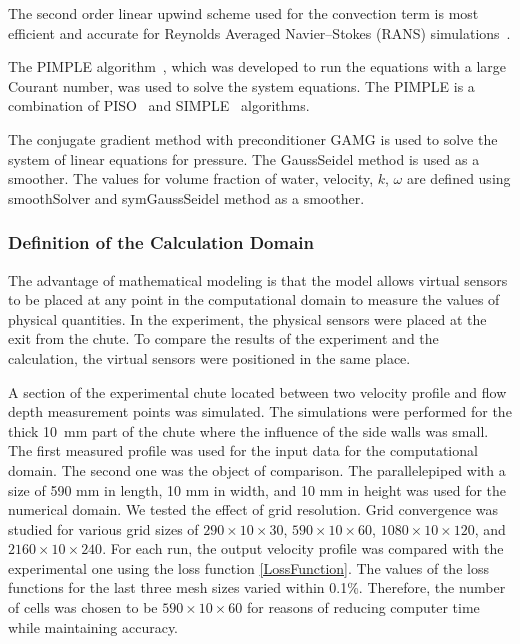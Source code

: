 \documentclass[mathematics,article,accept,pdftex,moreauthors]{Definitions/mdpi}
\begin{document}
The second order linear upwind scheme used for the convection term is most efficient and accurate for Reynolds Averaged Navier--Stokes (RANS) simulations~\cite{ROBERTSON2015122}.

The PIMPLE algorithm~\cite{Holzmann2019, Yin2003}, which was developed to run the equations with a large Courant number, was used to solve the system equations. The PIMPLE is a combination of PISO~\cite{Issa1986_2} and SIMPLE~\cite{Issa1986_1} algorithms.

%

The conjugate gradient method with preconditioner GAMG is used to solve the system of linear equations for pressure. The GaussSeidel method is used as a smoother. The values for volume fraction of water, velocity, $k$, $\omega$ are defined using smoothSolver and  symGaussSeidel method as a smoother. 

\subsubsection{Definition of the Calculation Domain}

The advantage of mathematical modeling is that the model allows virtual sensors to be placed at any point in the computational domain to measure the values of physical quantities. In the experiment, the physical sensors were placed at the exit from the chute. To compare the results of the experiment and the calculation, the virtual sensors were positioned in the same place.

A section of the experimental chute located between two velocity profile and flow depth measurement points was simulated. 
The simulations were performed for the thick  10~mm part of the chute where the influence of the side walls was small.
The first measured profile was used for the input data for the computational domain. The second one was the object of comparison. 
%
The parallelepiped with a size of 590 mm in length, 10 mm in width, and 10 mm in height was used for the  numerical domain.
%
We tested the effect of grid resolution. Grid convergence was studied for various grid sizes of $290 \times 10 \times 30$, $590 \times 10 \times 60$, $1080 \times 10 \times 120$, and $2160 \times 10 \times 240$. For each run, the output velocity profile was compared with the experimental one using the loss function \eqref{LossFunction}. The values of the loss functions for the last three mesh sizes varied within 0.1\%. Therefore, the number of cells was chosen to be $590 \times 10 \times 60$ for reasons of reducing computer time while maintaining accuracy.
\end{document}
